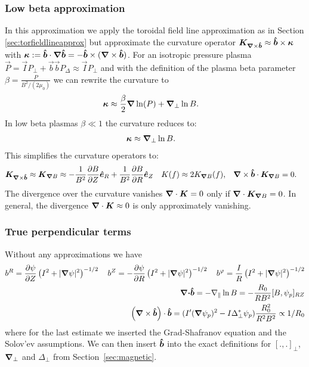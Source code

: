\subsubsection{Low beta approximation}\label{sec:lowbetaapprox}
In this approximation we apply the toroidal field line approximation
as in Section
\ref{sec:torfieldlineapprox}
but approximate the curvature operator $ {{\boldsymbol{K}}_{{\boldsymbol{\nabla}}\times\bm{\hat{b}}}} \approx \bm{\hat{b}}\times{\boldsymbol{\kappa}}$
  with
  ${\boldsymbol{\kappa}} := \bm{\hat{b}} \cdot{\boldsymbol{\nabla}}\bm{\hat{b}} = -\bm{\hat{b}} \times( {\boldsymbol{\nabla}}\times \bm{\hat{b}})$.
For an isotropic pressure plasma \(\vec{P} = \vec{I} P_\perp + \vec{b} \vec{b} P_\Delta \approx \vec{I} P_\perp\) and with the definition of the plasma beta parameter
\(\beta = \frac{P}{B^2/(2 \mu_0) } \)
we can rewrite the curvature to
\begin{align}
    {\boldsymbol{\kappa}} &\approx \frac{\beta}{2} {\boldsymbol{\nabla}} \ln(P) +{\boldsymbol{\nabla}}_{\perp} \ln{B} .
\end{align}
In low beta plasmas \(\beta\ll1\) the curvature reduces to:
\begin{align}
    {\boldsymbol{\kappa}} & \approx {\boldsymbol{\nabla}}_{\perp} \ln{B} .
\end{align}
This simplifies the curvature operators to:
\begin{align}
{{\boldsymbol{K}}_{{\boldsymbol{\nabla}}\times\bm{\hat{b}}}} \approx
{\boldsymbol{ {K} }}_{{\boldsymbol{\nabla}}  B}  &\approx  -\frac{1}{B^2}\frac{\partial B}{\partial Z}\bm{\hat{e}}_R +\frac{1}{B^2} \frac{\partial B}{\partial R}\bm{\hat{e}}_Z &
{K} (f) &\approx 2{K}_{{\boldsymbol{\nabla}}  B} (f) , &
    {\boldsymbol{\nabla}}\times\bm{\hat{b}} \cdot {{\boldsymbol{K}}_{{\boldsymbol{\nabla}}B}} &= 0.
\end{align}
The divergence over the curvature vanishes \( {\boldsymbol{\nabla}}\cdot {\boldsymbol{ {K} }} = 0\) only if \( {\boldsymbol{\nabla}}\cdot {{\boldsymbol{K}}_{{\boldsymbol{\nabla}}B}}   = 0\).
In general, the divergence \( {\boldsymbol{\nabla}}\cdot {\boldsymbol{ {K} }} \approx 0\) is only approximately vanishing.
\subsubsection{True perpendicular terms} \label{sec:trueapprox}

Without any approximations we have
\begin{align}
b^R = {\frac{\partial \psi}{\partial Z}}\left(I^2+|{\boldsymbol{\nabla}}\psi|^2\right)^{-1/2} \quad
b^Z = -{\frac{\partial \psi}{\partial R}}\left(I^2+|{\boldsymbol{\nabla}}\psi|^2\right)^{-1/2} \quad 
b^\varphi = \frac{I}{R}\left(I^2+|{\boldsymbol{\nabla}}\psi|^2\right)^{-1/2} \\
{\boldsymbol{{\boldsymbol{\nabla}}\cdot}}\bm{\hat{b}} = -\nabla_\parallel \ln B = -\frac{R_0}{R B^2}[B,\psi_p]_{RZ} \\
\left({{\boldsymbol{\nabla}}\times\bm{\hat{b}}}\right) \cdot\bm{\hat{b}} =
    (I'({\boldsymbol{\nabla}}\psi_p)^2 - I \Delta_\perp^* \psi_p)\frac{ R_0^2}{R^2B^2} \propto 1/R_0
\label{}
\end{align}
where for the last
estimate we inserted the Grad-Shafranov equation and the Solov'ev assumptions.
We can then insert $\bm{\hat{b}}$ into the exact definitions for $[.,.]_\perp$, ${\boldsymbol{\nabla}}_{\perp}$ and $\Delta_\perp$ from Section~\ref{sec:magnetic}.

